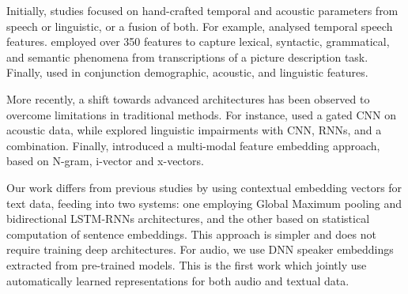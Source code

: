 Initially, studies focused on hand-crafted temporal and acoustic parameters from speech or linguistic, or a fusion of both. For example, \cite{konig2015automatic} analysed temporal speech features. \cite{fraser2016linguistic} employed over 350 features to capture lexical, syntactic, grammatical, and semantic phenomena from transcriptions of a picture description task. Finally, \cite{gosztolya2019identifying} used in conjunction demographic, acoustic, and linguistic features.

More recently, a shift towards advanced architectures has been observed to overcome limitations in traditional methods. For instance, \cite{warnita18_interspeech} used a gated CNN on acoustic data, while \cite{karlekar-etal-2018-detecting} explored linguistic impairments with CNN, RNNs, and a combination. Finally, \cite{zargarbashi2019multi} introduced a multi-modal feature embedding approach, based on N-gram, i-vector and x-vectors.

Our work differs from previous studies by using contextual embedding vectors for text data, feeding into two systems: one employing Global Maximum pooling and bidirectional LSTM-RNNs architectures, and the other based on statistical computation of sentence embeddings. This approach is simpler and does not require training deep architectures. For audio, we use DNN speaker embeddings extracted from pre-trained models. This is the first work which jointly use automatically learned representations for both audio and textual data.
